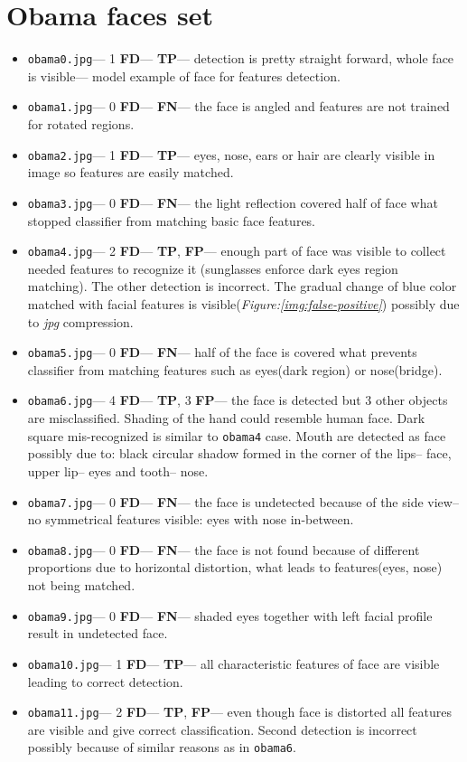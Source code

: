 \documentclass[11pt,a4paper,twocolumn]{article}
\begin{document}
\section*{Obama faces set}
\begin{itemize}
\item \texttt{obama0.jpg}--- 1 \textbf{FD}--- \textbf{TP}--- detection is pretty straight forward, whole face is visible--- model example of face for features detection.
\item \texttt{obama1.jpg}--- 0 \textbf{FD}--- \textbf{FN}--- the face is angled and features are not trained for rotated regions.
\item \texttt{obama2.jpg}--- 1 \textbf{FD}--- \textbf{TP}--- eyes, nose, ears or hair are clearly visible in image so features are easily matched.
\item \texttt{obama3.jpg}--- 0 \textbf{FD}--- \textbf{FN}--- the light reflection covered half of face what stopped classifier from matching basic face features.
\item \texttt{obama4.jpg}--- 2 \textbf{FD}--- \textbf{TP}, \textbf{FP}--- enough part of face was visible to collect needed features to recognize it (sunglasses enforce dark eyes region matching). The other detection is incorrect. The gradual change of blue color matched with facial features is visible(\textit{Figure:\ref{img:false-positive}}) possibly due to \textit{jpg} compression.
\item \texttt{obama5.jpg}--- 0 \textbf{FD}--- \textbf{FN}--- half of the face is covered what prevents classifier from matching features such as eyes(dark region) or nose(bridge).
\item \texttt{obama6.jpg}--- 4 \textbf{FD}--- \textbf{TP}, 3 \textbf{FP}--- the face is detected but 3 other objects are misclassified. Shading of the hand could resemble human face. Dark square mis-recognized is similar to \texttt{obama4} case. Mouth are detected as face possibly due to: black circular shadow formed in the corner of the lips-- face, upper lip-- eyes and tooth-- nose.
\item \texttt{obama7.jpg}--- 0 \textbf{FD}--- \textbf{FN}--- the face is undetected because of the side view-- no symmetrical features visible: eyes with nose in-between.
\item \texttt{obama8.jpg}--- 0 \textbf{FD}--- \textbf{FN}--- the face is not found because of different proportions due to horizontal distortion, what leads to features(eyes, nose) not being matched.
\item \texttt{obama9.jpg}--- 0 \textbf{FD}--- \textbf{FN}--- shaded eyes together with left facial profile result in undetected face.
\item \texttt{obama10.jpg}--- 1 \textbf{FD}--- \textbf{TP}--- all characteristic features of face are visible leading to correct detection.
\item \texttt{obama11.jpg}--- 2 \textbf{FD}--- \textbf{TP}, \textbf{FP}--- even though face is distorted all features are visible and give correct classification. Second detection is incorrect possibly because of similar reasons as in \texttt{obama6}.
\end{itemize}
\end{document}
